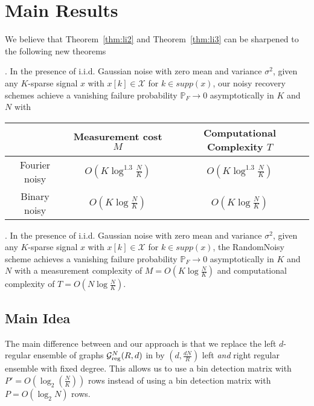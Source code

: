 \documentclass[conference,onecolumn]{IEEEtran}
\begin{document}
\section{Main Results}
We believe that Theorem~\ref{thm:li2} and Theorem~\ref{thm:li3} can be sharpened to the following new theorems
\begin{theorem}\label{thm:our1}. In the presence of i.i.d. Gaussian noise with zero mean and
variance $\sigma^2$, given any $K$-sparse signal $x$ with $x[k] \in \mathcal{X}$ for $k \in supp (x)$, our noisy recovery schemes achieve a vanishing failure probability $\mathbb{P}_F \rightarrow 0$ asymptotically in $K$ and $N$ with
\begin{center}
\begin{tabular}{|c|c|c|}
  \hline
   & Measurement cost $M$ &  Computational Complexity $T$ \\
  \hline
  Fourier noisy & $O\left(K \log^{1.3} \frac{N}{K} \right)$ & $O\left(K \log^{1.3} \frac{N}{K} \right)$ \\
  \hline
  Binary noisy & $O\left(K \log \frac{N}{K} \right)$  & $O\left(K \log \frac{N}{K} \right)$ \\
  \hline
\end{tabular}
\end{center}
\end{theorem}

\begin{theorem} \label{thm:our2}. In the presence of i.i.d. Gaussian noise with zero mean and
variance $\sigma^2$, given any $K$-sparse signal $x$ with $x[k] \in \mathcal{X}$ for $k \in supp (x)$, the RandomNoisy scheme achieves a vanishing failure probability $\mathbb{P}_F \rightarrow 0$ asymptotically in $K$ and $N$ with a measurement complexity of $M = O \left( K \log \frac{N}{K} \right)$ and computational complexity of $T = O \left( N \log \frac{N}{K} \right)$.
\end{theorem}

\subsection{Main Idea}
The main difference between \cite{li2015subdraft} and our approach is that we replace the left $d$-regular ensemble of graphs $\mathcal{G}^N_{\rm reg}(R,d)$ in \cite{li2015subdraft} by $\left(d, \frac{dN}{R} \right)$ left {\em and} right regular ensemble with fixed degree. This allows us to use a bin detection matrix with $P' = O\left(\log_2 \left( \frac{N}{K} \right)\right)$ rows
instead of using a bin detection matrix with $P = O(\log_2 N)$ rows.
\end{document}
